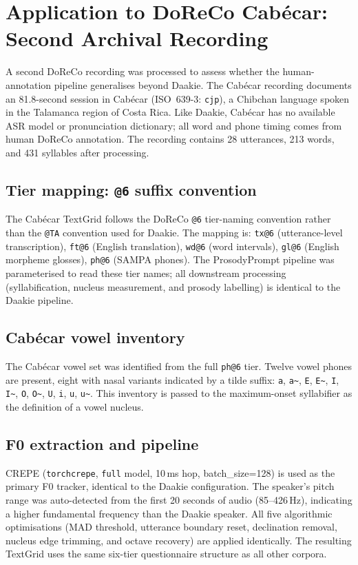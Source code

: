 \section{Application to DoReCo Cabécar: Second Archival Recording}
\label{sec:cabeca_pipeline}

A second DoReCo recording was processed to assess whether the human-annotation
pipeline generalises beyond Daakie. The Cabécar recording \cite{quesada2024cabeca}
documents an 81.8-second session in Cabécar (ISO~639-3: \texttt{cjp}), a Chibchan
language spoken in the Talamanca region of Costa Rica. Like Daakie, Cabécar has no
available ASR model or pronunciation dictionary; all word and phone timing
comes from human DoReCo annotation. The recording contains 28 utterances,
213 words, and 431 syllables after processing.

\subsection{Tier mapping: \texttt{@6} suffix convention}

The Cabécar TextGrid follows the DoReCo \texttt{@6} tier-naming convention
rather than the \texttt{@TA} convention used for Daakie. The mapping is:
\texttt{tx@6} (utterance-level transcription), \texttt{ft@6} (English
translation), \texttt{wd@6} (word intervals), \texttt{gl@6} (English morpheme
glosses), \texttt{ph@6} (SAMPA phones). The ProsodyPrompt pipeline was
parameterised to read these tier names; all downstream processing
(syllabification, nucleus measurement, and prosody labelling) is
identical to the Daakie pipeline.

\subsection{Cabécar vowel inventory}

The Cabécar vowel set was identified from the full \texttt{ph@6} tier. Twelve
vowel phones are present, eight with nasal variants indicated by a tilde suffix:
\texttt{a}, \texttt{a\~{}}, \texttt{E}, \texttt{E\~{}}, \texttt{I},
\texttt{I\~{}}, \texttt{O}, \texttt{O\~{}}, \texttt{U}, \texttt{i},
\texttt{u}, \texttt{u\~{}}. This inventory is passed to the maximum-onset
syllabifier as the definition of a vowel nucleus.

\subsection{F0 extraction and pipeline}

CREPE (\texttt{torchcrepe}, \texttt{full} model, 10\,ms hop, batch\_size=128)
is used as the primary F0 tracker, identical to the Daakie configuration. The
speaker's pitch range was auto-detected from the first 20 seconds of audio
(85--426\,Hz), indicating a higher fundamental frequency than the Daakie
speaker. All five algorithmic optimisations (MAD threshold, utterance boundary
reset, declination removal, nucleus edge trimming, and octave recovery) are
applied identically. The resulting TextGrid uses the same six-tier questionnaire
structure as all other corpora.


